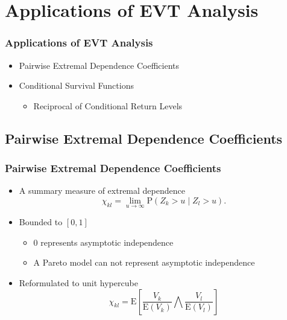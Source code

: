 \documentclass[aspectratio=169]{beamer}
\begin{document}
\section[EVT Applications]{Applications of EVT Analysis}

\begin{frame}
  \frametitle{Applications of EVT Analysis}
  \begin{itemize}
    \item Pairwise Extremal Dependence Coefficients
    \item Conditional Survival Functions
      \begin{itemize}
        \item Reciprocal of Conditional Return Levels
      \end{itemize}
  \end{itemize}
\end{frame}

\subsection{Pairwise Extremal Dependence Coefficients}

\begin{frame}
  \frametitle{Pairwise Extremal Dependence Coefficients}
    \begin{itemize}
      \item A summary measure of extremal dependence
      \begin{equation*}
        \chi_{kl} = \lim\limits_{u\to\infty}\text{P}\left(Z_k > u\mid Z_l > u\right).
      \end{equation*}
      \pause
      \item Bounded to $[0,1]$
        \begin{itemize}
          \item $0$ represents asymptotic independence
          \item A Pareto model can not represent asymptotic independence
        \end{itemize}
      \pause
      \item Reformulated to unit hypercube
        \begin{equation*}
          \chi_{kl} = \text{E}\left[\frac{V_k}{\text{E}(V_k)}{\bigwedge}\frac{V_l}{\text{E}(V_l)}\right]
        \end{equation*}
    \end{itemize}
\end{frame}
\end{document}
